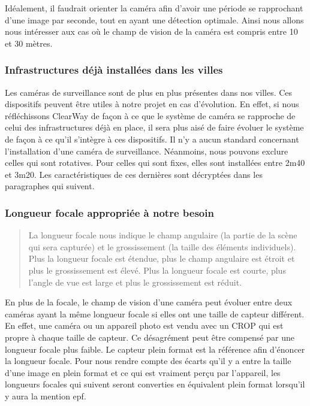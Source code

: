 Idéalement, il faudrait orienter la caméra afin d'avoir une période se rapprochant d'une image par seconde, tout en ayant une détection optimale.
Ainsi nous allons nous intéresser aux cas où le champ de vision de la caméra est compris entre 10 et 30 mètres.

\subsubsection{Infrastructures déjà installées dans les villes}
\label{sec:camera_infra}
Les caméras de surveillance sont de plus en plus présentes dans nos villes. Ces dispositifs peuvent être utiles à notre projet en cas d'évolution.
En effet, si nous réfléchissons ClearWay de façon à ce que le système de caméra se rapproche de celui des infrastructures déjà en place,
il sera plus aisé de faire évoluer le système de façon à ce qu'il s'intègre à ces dispositifs.
Il n'y a aucun standard concernant l'installation d'une caméra de surveillance. Néanmoins, nous pouvons exclure celles qui sont rotatives.
Pour celles qui sont fixes, elles sont installées entre 2m40 et 3m20. Les caractéristiques de ces dernières sont décryptées dans les paragraphes qui suivent.

\subsubsection{Longueur focale appropriée à notre besoin}
\label{sec:camera_focale}

\blockquote{La longueur focale nous indique le champ angulaire (la partie de la scène qui sera capturée)
    et le grossissement (la taille des éléments individuels).
    Plus la longueur focale est étendue, plus le champ angulaire est étroit et plus le grossissement est élevé.
    Plus la longueur focale est courte, plus l’angle de vue est large et plus le grossissement est réduit. \cite{focale}}

En plus de la focale, le champ de vision d'une caméra peut évoluer entre deux caméras ayant la même longueur focale
si elles ont une taille de capteur différent.
En effet, une caméra ou un appareil photo est vendu avec un \gls{CROP} qui est propre à chaque taille de capteur.
Ce désagrément peut être compensé par une longueur focale plus faible.
Le capteur plein format est la référence afin d'énoncer la longueur focale.
Pour nous rendre compte des écarts qu'il y a entre la taille d'une image en plein format et ce qui est vraiment perçu par l'appareil,
les longueurs focales qui suivent seront converties en équivalent plein format lorsqu'il y aura la mention \gls{epf}.

